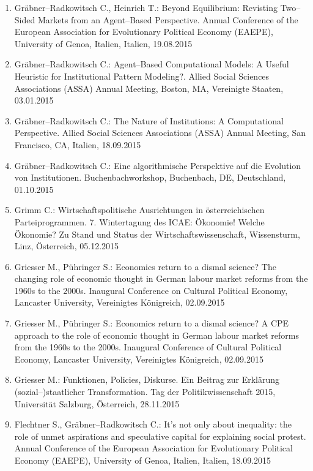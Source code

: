\begin{enumerate}
	\item Gräbner--Radkowitsch C., Heinrich T.: Beyond Equilibrium: Revisting Two--Sided Markets from an Agent--Based Perspective. Annual Conference of the European Association for Evolutionary Political Economy (EAEPE), University of Genoa, Italien, Italien, 19.08.2015
	\item Gräbner--Radkowitsch C.: Agent--Based Computational Models: A Useful Heuristic for Institutional Pattern Modeling?. Allied Social Sciences Associations (ASSA) Annual Meeting, Boston, MA, Vereinigte Staaten, 03.01.2015
	\item Gräbner--Radkowitsch C.: The Nature of Institutions: A Computational Perspective. Allied Social Sciences Associations (ASSA) Annual Meeting, San Francisco, CA, Italien, 18.09.2015
	\item Gräbner--Radkowitsch C.: Eine algorithmische Perspektive auf die Evolution von Institutionen. Buchenbachworkshop, Buchenbach, DE, Deutschland, 01.10.2015
	\item Grimm C.: Wirtschaftspolitische Ausrichtungen in österreichischen Parteiprogrammen. 7. Wintertagung des ICAE: Ökonomie! Welche Ökonomie? Zu Stand und Status der Wirtschaftswissenschaft, Wissensturm, Linz, Österreich, 05.12.2015
	\item Griesser M., Pühringer S.: Economics return to a dismal science? The changing role of economic thought in German labour market reforms from the 1960s to the 2000s. Inaugural Conference on Cultural Political Economy, Lancaster University, Vereinigtes Königreich, 02.09.2015
	\item Griesser M., Pühringer S.: Economics return to a dismal science? A CPE approach to the role of economic thought in German labour market reforms from the 1960s to the 2000s. Inaugural Conference of Cultural Political Economy, Lancaster University, Vereinigtes Königreich, 02.09.2015
	\item Griesser M.: Funktionen, Policies, Diskurse. Ein Beitrag zur Erklärung (sozial--)staatlicher Transformation. Tag der Politikwissenschaft 2015, Universität Salzburg, Österreich, 28.11.2015
	\item Flechtner S., Gräbner--Radkowitsch C.: It’s not only about inequality: the role of unmet aspirations and speculative capital for explaining social protest. Annual Conference of the European Association for Evolutionary Political Economy (EAEPE), University of Genoa, Italien, Italien, 18.09.2015
\end{enumerate}
